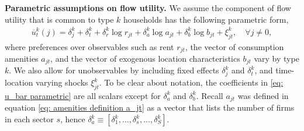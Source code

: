 \documentclass[11pt]{article}
\newcommand{\Paragraph}{\vspace{0.1cm}\noindent\textbf}
\begin{document}
\Paragraph{Parametric assumptions on flow utility.} We assume the component of flow utility that is common to type $k$ households has the following parametric form,
\begin{align}\label{eq: u_bar parametric}
\overline{u}^k_t(j) = \delta_{j}^k + \delta^k_t + \delta_{r}^k \log r_{jt} + \delta_{a}^k \log a_{jt} + \delta_b^k \log b_{jt} + \xi_{{j}t}^k, \quad \forall j\neq 0,
\end{align}
where preferences over observables such as rent $r_{jt}$, the vector of consumption amenities $a_{jt}$, and the vector of exogenous location characteristics $b_{jt}$ vary by type $k$. We also allow for unobservables by including fixed effects $\delta_{j}^k$ and $\delta^k_t$, and time-location varying shocks $\xi_{jt}^k$. To be clear about notation, the coefficients in \ref{eq: u_bar parametric} are all scalars except for $\delta_{a}^k$ and $\delta_{b}^k$. Recall $a_{jt}$ was defined in equation \eqref{eq: amenities definition a_jt} as a vector that lists the number of firms in each sector $s$, hence $\delta_{a}^k\equiv[\delta_{1}^k,\dots,\delta_{s}^k, \dots, \delta_{S}^k]$.
\end{document}
